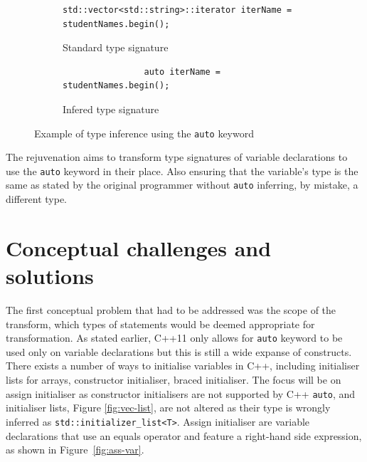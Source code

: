 \documentclass[bsc,frontabs,singlespacing,twoside,parskip,deptreport]{infthesis}
\begin{document}
\begin{figure}[!h]
    \centering
    \begin{subfigure}[h]{\textwidth}
        \centering
        \begin{verbatim}
std::vector<std::string>::iterator iterName = studentNames.begin();
        \end{verbatim}
        \caption{Standard type signature}
        \label{fig:auto-type-before}
    \end{subfigure}
    \begin{subfigure}[h]{\textwidth}
        \centering
        \vspace{0.2cm}
        \begin{verbatim}
                auto iterName = studentNames.begin(); 
        \end{verbatim}
        \caption{Infered type signature}
        \label{fig:auto-type-after}
    \end{subfigure}
    \caption{Example of type inference using the \texttt{auto} keyword}
    \label{fig:auto-type}
\end{figure}

The rejuvenation aims to transform type signatures of variable declarations to use the \texttt{auto} keyword in their place. Also ensuring that the variable's type is the same as stated by the original programmer without \texttt{auto} inferring, by mistake, a different type.


\section{Conceptual challenges and solutions}
The first conceptual problem that had to be addressed was the scope of the transform, which types of statements would be deemed appropriate for transformation. As stated earlier, C++11 only allows for \texttt{auto} keyword to be used only on variable declarations but this is still a wide expanse of constructs. There exists a number of ways to initialise variables in C++, including initialiser lists for arrays, constructor initialiser, braced initialiser. The focus will be on assign initialiser as constructor initialisers are not supported by C++ \texttt{auto}, and initialiser lists, Figure \ref{fig:vec-list}, are not altered as their type is wrongly inferred as \texttt{std::initializer\_list<T>}. Assign initialiser are variable declarations that use an equals operator and feature a right-hand side expression, as shown in Figure~\ref{fig:ass-var}.
\end{document}

